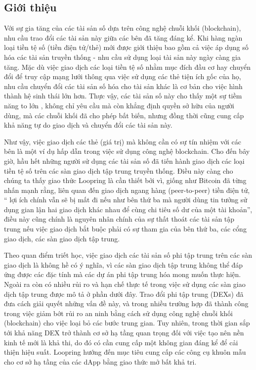 \documentclass{article}
\begin{document}
\begin{multicols}{2}
\section{Giới thiệu\label{sec:introduction}}

Với sự gia tăng của các tài sản số dựa trên công nghệ chuỗi khối (blockchain), nhu cầu trao đổi các tài sản này giữa các bên đã tăng đáng kể. Khi hàng ngàn loại tiền tệ số (tiền điện tử/thẻ) mới được giới thiệu bao gồm cả việc áp dụng số hóa các tài sản truyền thống - nhu cầu sử dụng loại tài sản này ngày càng gia tăng. Mặc dù việc giao dịch các loại tiền tệ số nhằm mục đích đầu cơ hay chuyển đổi để truy cập mạng lưới thông qua việc sử dụng các thẻ tiện ích gốc của họ, nhu cầu chuyển đổi các tài sản số hóa cho tài sản khác là cơ bản cho việc hình thành hệ sinh thái lớn hơn. Thực vậy, các tài sản số này cho thấy một sự tiềm năng to lớn \cite{desotocapital}, không chỉ  yêu cầu mà còn khẳng định quyền sở hữu của người dùng, mà các chuỗi khối đã cho phép bất biến, nhưng đồng thời cũng cung cấp khả năng tự do giao dịch và chuyển đổi các tài sản này.
 
Như vậy, việc giao dịch các thẻ (giá trị) mà không cần có sự tín nhiệm với các bên là một ví dụ hấp dẫn trong việc sử dụng công nghệ blockchain. Cho đến bây giờ, hầu hết những người sử dụng các tài sản số đã tiến hành giao dịch các loại tiền tệ số trên các sàn giao dịch tập trung truyền thống. Điều này càng cho chúng ta thấy giao thức Loopring là cần thiết bởi vì, giống như Bitcoin \cite{nakamoto2008bitcoin} đã từng nhấn mạnh rằng, liên quan đến giao dịch ngang hàng (peer-to-peer) tiền điện tử, \enquote{ lợi ích chính vẫn sẽ bị mất đi nếu như bên thứ ba mà người dùng tin tưởng sử dụng gian lận hai giao dịch khác nhau để cùng chi tiêu số dư của một tài khoản}, điều này cũng chính là nguyên nhân chính của sự thất thoát các tài sản tập trung nếu việc giao dịch bắt buộc phải có sự tham gia của bên thứ ba, các cổng giao dịch, các sàn giao dịch tập trung.

Theo quan điểm triết học, việc giao dịch các tài sản số phi tập trung trên các sàn giao dịch là không hề có ý nghĩa, vì các sàn giao dịch tập trung không thể đáp ứng được các đặc tính mà các dự án phi tập trung hóa mong muốn thực hiện. Ngoài ra còn có nhiều rủi ro và hạn chế thực tế trong việc sử dụng các sàn giao dịch tập trung được mô tả ở phần dưới đây. Trao đổi phi tập trung (DEXs) \cite{schuh2015bitshares} \cite{bancor} \cite{kyber} đã đưa cách giải quyết những vấn đề này, và trong nhiều trường hợp đã thành công trong việc giảm bớt rủi ro an ninh bằng cách sử dụng công nghệ chuỗi khối (blockchain) cho việc loại bỏ các bước trung gian. Tuy nhiên, trong thời gian sắp tới khả năng DEX trở thành cơ sở hạ tầng quan trọng đối với việc tạo nên nền kinh tế mới là khả thi, do đó có cần cung cấp một không gian đáng kể để cải thiện hiệu suất. Loopring hướng đến mục tiêu cung cấp các công cụ khuôn mẫu cho cơ sở hạ tầng của các dApp bằng giao thức mở bất khả tri.


\end{multicols}
\end{document}
